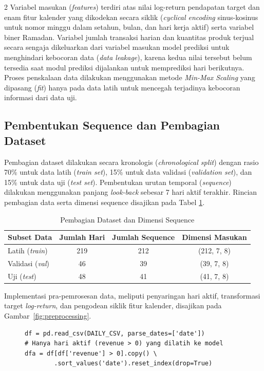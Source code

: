 \documentclass[12pt, a4paper, onecolumn, oneside]{report}
\begin{document}
\begin{spacing}{2}
Variabel masukan (\textit{features}) terdiri atas nilai log-return pendapatan target dan enam fitur kalender yang dikodekan secara siklik (\textit{cyclical encoding} sinus-kosinus untuk nomor minggu dalam setahun, bulan, dan hari kerja aktif) serta variabel biner Ramadan. Variabel jumlah transaksi harian dan kuantitas produk terjual secara sengaja dikeluarkan dari variabel masukan model prediksi untuk menghindari kebocoran data (\textit{data leakage}), karena kedua nilai tersebut belum tersedia saat modul prediksi dijalankan untuk memprediksi hari berikutnya. Proses penskalaan data dilakukan menggunakan metode \textit{Min-Max Scaling} yang dipasang (\textit{fit}) hanya pada data latih untuk mencegah terjadinya kebocoran informasi dari data uji.

\subsection{Pembentukan Sequence dan Pembagian Dataset}
Pembagian dataset dilakukan secara kronologis (\textit{chronological split}) dengan rasio 70\% untuk data latih (\textit{train set}), 15\% untuk data validasi (\textit{validation set}), dan 15\% untuk data uji (\textit{test set}). Pembentukan urutan temporal (\textit{sequence}) dilakukan menggunakan panjang \textit{look-back} sebesar 7 hari aktif terakhir. Rincian pembagian data serta dimensi sequence disajikan pada Tabel \ref{tab:pembagian_data_sequence}.

\begin{table}[H]
\centering
\caption{Pembagian Dataset dan Dimensi Sequence}
\label{tab:pembagian_data_sequence}
\begin{tabular}{|l|c|c|c|}
\hline
\textbf{Subset Data} & \textbf{Jumlah Hari} & \textbf{Jumlah Sequence} & \textbf{Dimensi Masukan} \\ \hline
Latih (\textit{train}) & 219 & 212 & (212, 7, 8) \\ \hline
Validasi (\textit{val}) & 46 & 39 & (39, 7, 8) \\ \hline
Uji (\textit{test}) & 48 & 41 & (41, 7, 8) \\ \hline
\end{tabular}
\end{table}

Implementasi pra-pemrosesan data, meliputi penyaringan hari aktif, transformasi target \textit{log-return}, dan pengodean siklik fitur kalender, disajikan pada Gambar~\ref{fig:preprocessing}.

\begin{figure}[H]
\begin{lstlisting}
df = pd.read_csv(DAILY_CSV, parse_dates=['date'])
# Hanya hari aktif (revenue > 0) yang dilatih ke model
dfa = df[df['revenue'] > 0].copy() \
        .sort_values('date').reset_index(drop=True)


\end{lstlisting}
\end{figure}
\end{spacing}
\end{document}
